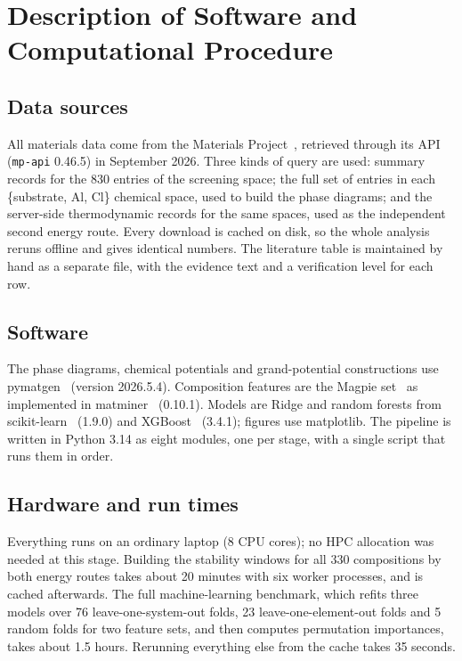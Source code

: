 \documentclass{report}
\begin{document}
\pagebreak
\section{Description of Software and Computational Procedure}
\label{sec:setup}

\subsection{Data sources}
All materials data come from the Materials Project~\citep{Jain2013}, retrieved through its API (\texttt{mp-api} 0.46.5) in September 2026. Three kinds of query are used: summary records for the 830 entries of the screening space; the full set of entries in each \{substrate, Al, Cl\} chemical space, used to build the phase diagrams; and the server-side thermodynamic records for the same spaces, used as the independent second energy route. Every download is cached on disk, so the whole analysis reruns offline and gives identical numbers. The literature table is maintained by hand as a separate file, with the evidence text and a verification level for each row.

\subsection{Software}
The phase diagrams, chemical potentials and grand-potential constructions use pymatgen~\citep{Ong2013} (version 2026.5.4). Composition features are the Magpie set~\citep{Ward2016} as implemented in matminer~\citep{Ward2018} (0.10.1). Models are Ridge and random forests from scikit-learn~\citep{Pedregosa2011} (1.9.0) and XGBoost~\citep{Chen2016} (3.4.1); figures use matplotlib. The pipeline is written in Python 3.14 as eight modules, one per stage, with a single script that runs them in order.

\subsection{Hardware and run times}
Everything runs on an ordinary laptop (8 CPU cores); no HPC allocation was needed at this stage. Building the stability windows for all 330 compositions by both energy routes takes about 20 minutes with six worker processes, and is cached afterwards. The full machine-learning benchmark, which refits three models over 76 leave-one-system-out folds, 23 leave-one-element-out folds and 5 random folds for two feature sets, and then computes permutation importances, takes about 1.5 hours. Rerunning everything else from the cache takes 35 seconds.
\end{document}
